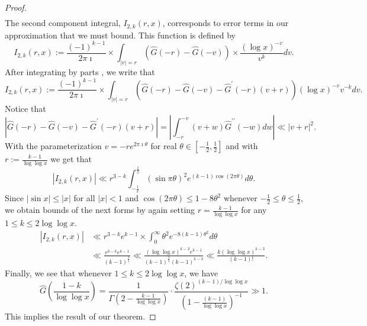 \documentclass[11pt,reqno,a4letter]{article}
\numberwithin{figure}{section}
\numberwithin{table}{section}
\newcommand{\cf}{\textit{cf.\ }}
\theoremstyle{plain}
\numberwithin{theorem}{section}
\theoremstyle{definition}
\begin{document}
\begin{proof}
\begin{align*}
\end{align*}
The second component integral, $I_{2,k}(r, x)$, corresponds to error terms in our approximation 
that we must bound. This function is defined by 
\[
I_{2,k}(r, x) := \frac{(-1)^{k-1}}{2\pi\imath} \times \int_{|v|=r} (\widehat{G}(-r) - \widehat{G}(-v)) 
     \times \frac{(\log x)^{-v}}{v^k} dv. 
\]
After integrating by parts \cite[\cf Thm.\ 7.19; \S 7.4]{MV}, we write that 
\[
I_{2,k}(r, x) := \frac{(-1)^{k-1}}{2\pi\imath} \times \int_{|v|=r} (\widehat{G}(-r) - \widehat{G}(-v) - 
     \widehat{G}^{\prime}(-r)(v+r)) 
     (\log x)^{-v} v^{-k} dv. 
\]
Notice that 
\[
\left\lvert \widehat{G}(-r) - \widehat{G}(-v) - \widehat{G}^{\prime}(-r)(v+r) \right\rvert = 
     \left\lvert \int_{-r}^{-v} 
     (v+w) \widehat{G}^{\prime\prime}(-w) dw \right\rvert 
     \ll |v+r|^2. 
\]
With the parameterization $v = -re^{2\pi\imath\theta}$ for real 
$\theta \in \left[-\frac{1}{2}, \frac{1}{2}\right]$ and 
with $r := \frac{k-1}{\log\log x}$ 
we get that 
\[
|I_{2,k}(r, x)| \ll r^{3-k} \int_{-\frac{1}{2}}^{\frac{1}{2}} (\sin \pi\theta)^2 e^{(k-1) \cos(2\pi\theta)} d\theta. 
\]
Since $|\sin x| \leq |x|$ for all $|x| < 1$ and $\cos(2\pi\theta) \leq 1 - 8\theta^2$ whenever 
$-\frac{1}{2} \leq \theta \leq \frac{1}{2}$, we obtain bounds of the next forms by again 
setting $r = \frac{k-1}{\log\log x}$ for any $1 \leq k \leq 2\log\log x$. 
\begin{align*}
|I_{2,k}(r, x)| & \ll r^{3-k} e^{k-1} \times \int_0^{\infty} \theta^2 e^{-8(k-1) \theta^2} d\theta \\ 
     & \ll \frac{r^{3-k} e^{k-1}}{(k-1)^{\frac{3}{2}}} \ll 
     \frac{(\log\log x)^{k-3} e^{k-1}}{(k-1)^{\frac{3}{2}} (k-1)^{k-3}} 
     \ll 
     \frac{k (\log\log x)^{k-3}}{(k-1)!}. 
\end{align*}
Finally, we see that whenever $1 \leq k \leq 2\log\log x$, we have 
\[
\widehat{G}\left(\frac{1-k}{\log\log x}\right) = \frac{1}{\Gamma\left(2-\frac{k-1}{\log\log x}\right)} \cdot 
     \frac{\zeta(2)^{(k-1)/\log\log x}}{\left(1-\frac{(k-1)}{\log\log x}\right)^{-1}} \gg 1. 
\]
This implies the result of our theorem. 
\end{proof} 
\end{document}

